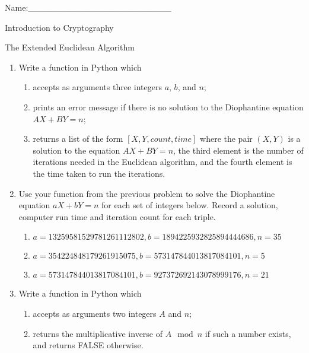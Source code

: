\documentclass[12pt]{amsart}
\theoremstyle{definition}
\theoremstyle{remark}
\numberwithin{equation}{section}
\begin{document}
\begin{flushright}
Name:\_\_\_\_\_\_\_\_\_\_\_\_\_\_\_\_\_\_\_\_\_\_\_
\end{flushright}
\vspace{10pt}
\begin{center}
Introduction to Cryptography

The Extended Euclidean Algorithm
\end{center}



\begin{enumerate}
\item Write a function in Python which 
\begin{enumerate}
\item accepts as arguments three integers $a$, $b$, and $n$;
\item prints an error message if there is no solution to the Diophantine equation $AX+BY=n$;
\item returns a list of the form $\left[X,Y,count,time\right]$ where the pair $(X,Y)$ is a solution to the equation $AX+BY=n$, the third element is the number of iterations needed in the Euclidean algorithm, and the fourth element is the time taken to run the iterations. 
\end{enumerate} 
\item Use your function from the previous problem to solve the Diophantine equation $aX+bY=n$ for each set of integers below. Record a solution, computer run time and iteration count for each triple. 
\begin{enumerate}
\item $a=13259581529781261112802, b=1894225932825894444686, n=35$
\item $a=354224848179261915075, b=573147844013817084101, n=5$
\item $a=573147844013817084101, b=927372692143078999176, n= 21$
\end{enumerate}

\item Write a function in Python which 
\begin{enumerate}
\item accepts as arguments two integers $A$ and $n$;
\item returns the multiplicative inverse of $A \mod n$ if such a number exists, and returns FALSE otherwise.
\end{enumerate} 

\end{enumerate}
\end{document}
